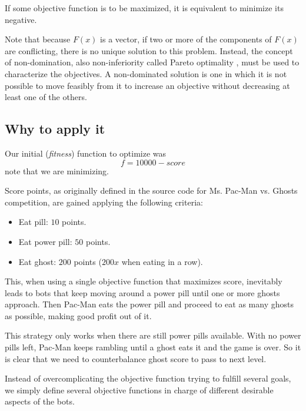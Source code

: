 \documentclass{llncs}
\newcommand{\pacman}{Ms. Pac-Man vs. Ghosts }
\newcommand{\paco}{Pac-Man }
\begin{document}
If some objective function is to be maximized, it is equivalent to minimize its negative.

Note that because $F(x)$ is a vector, if two or more of the components of $F(x)$ are conflicting, there is no unique solution to this problem. Instead, the concept of non-domination, also non-inferiority called Pareto optimality \cite{Censor:78}, must be used to characterize the objectives. A non-dominated solution is one in which it is not possible to move feasibly from it to increase an objective without decreasing at least one of the others.


\subsection{Why to apply it}
Our initial (\textit{fitness}) function to optimize was
\begin{equation} %
f = 10000 - score
\end{equation}
note that we are minimizing.

Score points, as originally defined in the source code for \pacman competition, are gained applying the following criteria:
\begin{itemize}
\item Eat pill: $10$ points.
\item Eat power pill: $50$ points.
\item Eat ghost: $200$ points ($200x$ when eating in a row).
\end{itemize}

This, when using a single objective function that maximizes score, inevitably leads to bots that keep moving around a power pill until one or more ghosts approach. Then \paco eats the power pill and proceed to eat as many ghosts as possible, making good profit out of it.

This strategy only works when there are still power pills available. With no power pills left, \paco keeps rambling until a ghost eats it and the game is over. So it is clear that we need to counterbalance ghost score to pass to next level.

Instead of overcomplicating the objective function trying to fulfill several goals, we simply define several objective functions in charge of different desirable aspects of the bots.
\end{document}
